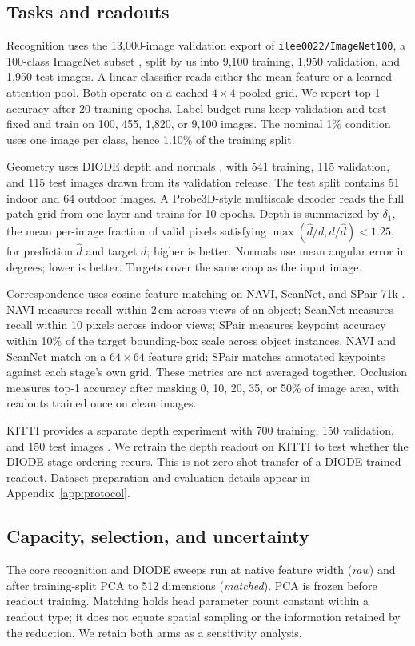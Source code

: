 \subsection{Tasks and readouts}
Recognition uses the 13,000-image validation export of \texttt{ilee0022/ImageNet100},
a 100-class ImageNet subset \citep{deng2009imagenet,ilee0022imagenet100}, split by us into
9,100 training, 1,950 validation, and 1,950 test images. A linear classifier reads either
the mean feature or a learned attention pool. Both operate on a cached $4\times4$ pooled
grid. We report top-1 accuracy after 20 training epochs. Label-budget runs keep validation
and test fixed and train on 100, 455, 1,820, or 9,100 images. The nominal 1\% condition
uses one image per class, hence 1.10\% of the training split.

Geometry uses DIODE depth and normals \citep{vasiljevic2019diode}, with 541 training,
115 validation, and 115 test images drawn from its validation release. The test split
contains 51 indoor and 64 outdoor images. A Probe3D-style multiscale decoder reads the
full patch grid from one layer and trains for 10 epochs. Depth is summarized by
$\delta_1$, the mean per-image fraction of valid pixels satisfying
$\max(\hat d/d,d/\hat d)<1.25$, for prediction $\hat d$ and target $d$; higher is better. Normals use mean angular error in
degrees; lower is better. Targets cover the same crop as the input image.

Correspondence uses cosine feature matching on NAVI, ScanNet, and SPair-71k
\citep{jampani2023navi,dai2017scannet,min2019spair}. NAVI measures recall within 2\,cm
across views of an object; ScanNet measures recall within 10 pixels across indoor views;
SPair measures keypoint accuracy within 10\% of the target bounding-box scale across
object instances. NAVI and ScanNet match on a $64\times64$ feature grid; SPair matches
annotated keypoints against each stage's own grid. These metrics are not averaged together. Occlusion measures top-1 accuracy after masking
0, 10, 20, 35, or 50\% of image area, with readouts trained once on clean images.

KITTI provides a separate depth experiment with 700 training, 150 validation, and
150 test images \citep{geiger2012kitti,uhrig2017sparsity}. We retrain the depth readout
on KITTI to test whether the DIODE stage ordering recurs. This is not zero-shot transfer
of a DIODE-trained readout. Dataset preparation and evaluation details appear in
Appendix~\ref{app:protocol}.

\subsection{Capacity, selection, and uncertainty}
\label{sec:selection}
The core recognition and DIODE sweeps run at native feature width (\emph{raw}) and after
training-split PCA to 512 dimensions (\emph{matched}). PCA is frozen before readout training. Matching
holds head parameter count constant within a readout type; it does not equate spatial
sampling or the information retained by the reduction. We retain both arms as a
sensitivity analysis.

